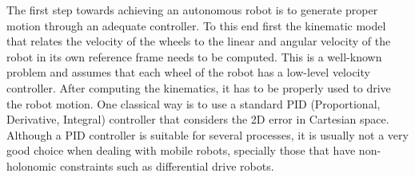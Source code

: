 \documentclass[conference]{IEEEtran}
\begin{document}
The first step towards achieving an autonomous robot is to generate proper
motion through an adequate controller. To this end first the kinematic model
that relates the velocity of the wheels to the linear and angular velocity of
the robot in its own reference frame needs to be computed. This is a well-known
problem and assumes that each wheel of the robot has a low-level velocity
controller. After computing the kinematics, it has to be properly used to drive
the robot motion. One classical way is to use a standard PID (Proportional,
Derivative, Integral) controller that considers the 2D error in Cartesian
space. Although a PID controller is suitable for several processes, it is
usually not a very good choice when dealing with mobile robots, specially those
that have non-holonomic constraints such as differential drive robots.
\end{document}
